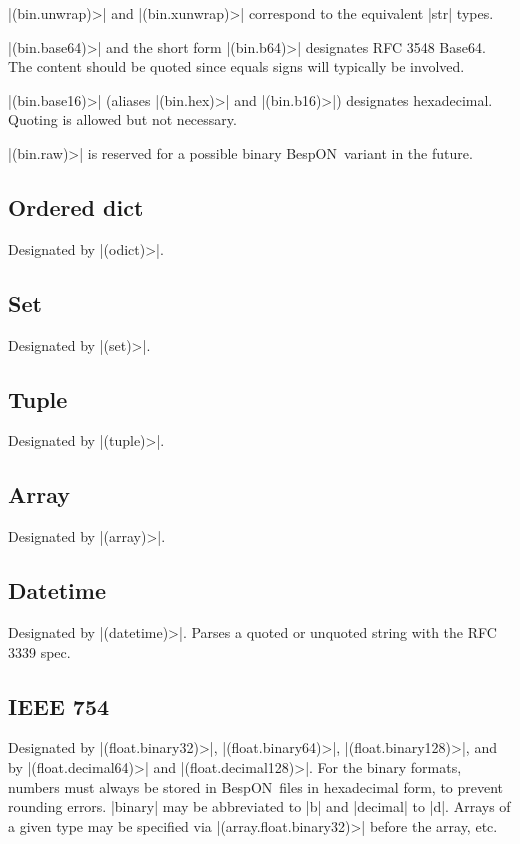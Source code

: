 \documentclass[11pt]{article}
\newcommand{\bespon}{BespON}
\begin{document}
|(bin.unwrap)>| and |(bin.xunwrap)>| correspond to the equivalent |str| types.

|(bin.base64)>| and the short form |(bin.b64)>| designates RFC 3548 Base64.  The content should be quoted since equals signs will typically be involved.

|(bin.base16)>| (aliases |(bin.hex)>| and |(bin.b16)>|) designates hexadecimal.  Quoting is allowed but not necessary.

|(bin.raw)>| is reserved for a possible binary \bespon\ variant in the future.

\subsection{Ordered dict}

Designated by |(odict)>|.

\subsection{Set}

Designated by |(set)>|.

\subsection{Tuple}

Designated by |(tuple)>|.


\subsection{Array}

Designated by |(array)>|.

\subsection{Datetime}

Designated by |(datetime)>|.  Parses a quoted or unquoted string with the RFC 3339 spec.

\subsection{IEEE 754}

Designated by |(float.binary32)>|, |(float.binary64)>|, |(float.binary128)>|, and by |(float.decimal64)>| and |(float.decimal128)>|.  For the binary formats, numbers must always be stored in \bespon\ files in hexadecimal form, to prevent rounding errors.  |binary| may be abbreviated to |b| and |decimal| to |d|.  Arrays of a given type may be specified via |(array.float.binary32)>| before the array, etc.
\end{document}
